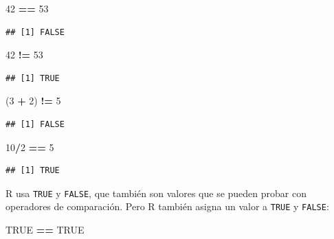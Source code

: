 \documentclass[]{book}
\newenvironment{Shaded}{\begin{snugshade}}{\end{snugshade}}
\newcommand{\DecValTok}[1]{\textcolor[rgb]{0.00,0.00,0.81}{#1}}
\newcommand{\StringTok}[1]{\textcolor[rgb]{0.31,0.60,0.02}{#1}}
\newcommand{\OtherTok}[1]{\textcolor[rgb]{0.56,0.35,0.01}{#1}}
\newcommand{\OperatorTok}[1]{\textcolor[rgb]{0.81,0.36,0.00}{\textbf{#1}}}
\newcommand{\NormalTok}[1]{#1}
\begin{document}
\begin{Shaded}
\begin{Highlighting}[]
\DecValTok{42} \OperatorTok{==}\StringTok{ }\DecValTok{53}
\end{Highlighting}
\end{Shaded}

\begin{verbatim}
## [1] FALSE
\end{verbatim}

\begin{Shaded}
\begin{Highlighting}[]
\DecValTok{42} \OperatorTok{!=}\StringTok{ }\DecValTok{53}
\end{Highlighting}
\end{Shaded}

\begin{verbatim}
## [1] TRUE
\end{verbatim}

\begin{Shaded}
\begin{Highlighting}[]
\NormalTok{(}\DecValTok{3} \OperatorTok{+}\StringTok{ }\DecValTok{2}\NormalTok{) }\OperatorTok{!=}\StringTok{ }\DecValTok{5}
\end{Highlighting}
\end{Shaded}

\begin{verbatim}
## [1] FALSE
\end{verbatim}

\begin{Shaded}
\begin{Highlighting}[]
\DecValTok{10}\OperatorTok{/}\DecValTok{2} \OperatorTok{==}\StringTok{ }\DecValTok{5}
\end{Highlighting}
\end{Shaded}

\begin{verbatim}
## [1] TRUE
\end{verbatim}

R usa \texttt{TRUE} y \texttt{FALSE}, que también son valores que se
pueden probar con operadores de comparación. Pero R también asigna un
valor a \texttt{TRUE} y \texttt{FALSE}:

\begin{Shaded}
\begin{Highlighting}[]
\OtherTok{TRUE} \OperatorTok{==}\StringTok{ }\OtherTok{TRUE}
\end{Highlighting}
\end{Shaded}
\end{document}
